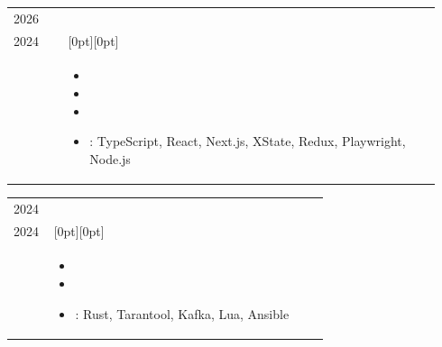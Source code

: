 \documentclass[10pt]{article}
\makeatletter
\newif\ifen
\newif\ifru
\newcommand{\en}[1]{\ifen#1\fi}
\newcommand{\ru}[1]{\ifru#1\fi}
\newcommand{\dates}[2]{\footnotesize #2\\[-1pt]\footnotesize #1}
\newcommand{\workentry}[3]{
\begin{tabular}{@{}p{0.125\linewidth}|p{0.82\linewidth}@{}}
\raggedleft #1 & \raisebox{-1.5pt}[0pt][0pt]{\textbf{#2}} \\[-12pt]
& #3
\end{tabular}\vspace{1mm}
}
\makeatother
\begin{document}
\workentry
{\dates{\ru{Сентябрь}\en{September} 2024}{\ru{Май}\en{May} 2026}}
{\ru{Яндекс Плюс --- Frontend-разработчик}\en{Yandex Plus --- Frontend Developer}}
{
\begin{itemize}
    \item \ru{Реализовал допродажу тарифов и опций на главном экране оплаты: продажи дополнительных опций выросли на 1\%}
          \en{Implemented plan and option upsell on the main payment screen, increasing add-on sales by 1\%}
    \item \ru{Реализовал онбординг после оплаты подписки, что повысило вовлечённость пользователей на 5\%}
          \en{Implemented post-payment onboarding, increasing user engagement by 5\%}
    \item \ru{Добавил историю изменений промокампаний и развивал сценарии оплаты и активации подписки}
          \en{Added promo campaign change history and improved subscription payment and activation flows}
    \item \ru{Стек}\en{Stack}: TypeScript, React, Next.js, XState, Redux, Playwright, Node.js
\end{itemize}
}

\workentry
{\dates{\ru{Февраль}\en{February} 2024}{\ru{Сентябрь}\en{September} 2024}}
{\ru{Arenadata (Picodata) --- Rust-разработчик}\en{Arenadata (Picodata) --- Rust Developer}}
{
\begin{itemize}
    \item \ru{Писал и оптимизировал Ansible-сценарии для воспроизводимого развёртывания распределённых приложений}
          \en{Developed and optimized Ansible workflows for reproducible deployment of distributed applications}
    \item \ru{Перевёл автотесты с Lua на Rust: время выполнения сократилось на 10\%, разработка и тестирование были унифицированы на одном языке}
          \en{Migrated automated tests from Lua to Rust, reducing execution time by 10\% and unifying development and testing on a single language}
    \item \ru{Стек}\en{Stack}: Rust, Tarantool, Kafka, Lua, Ansible
\end{itemize}
}
\end{document}
